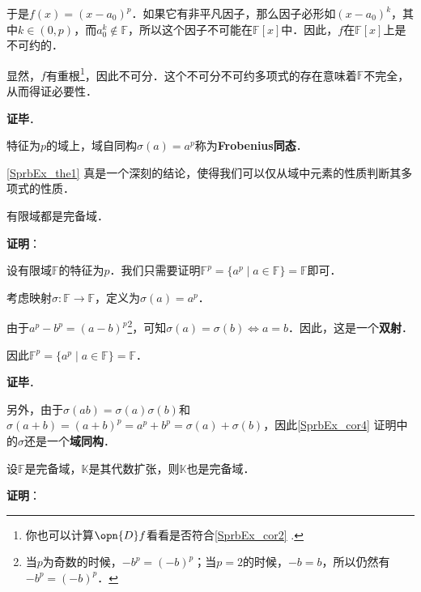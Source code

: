 于是$f(x)=(x-a_0)^p$．如果它有非平凡因子，那么因子必形如$(x-a_0)^k$，其中$k\in(0, p)$，而$a_0^k\not\in\mathbb{F}$，所以这个因子不可能在$\mathbb{F}[x]$中．因此，$f$在$\mathbb{F}[x]$上是不可约的．

显然，$f$有重根\footnote{你也可以计算$\opn{D}f$看看是否符合\autoref{SprbEx_cor2} .}，因此不可分．这个不可分不可约多项式的存在意味着$\mathbb{F}$不完全，从而得证必要性．

\textbf{证毕}．




特征为$p$的域上，域自同构$\sigma(a)=a^p$称为\textbf{Frobenius同态}．


\autoref{SprbEx_the1} 真是一个深刻的结论，使得我们可以仅从域中元素的性质判断其多项式的性质．









\begin{corollary}{}\label{SprbEx_cor4}
有限域都是完备域．
\end{corollary}

\textbf{证明}：

设有限域$\mathbb{F}$的特征为$p$．我们只需要证明$\mathbb{F}^p=\{a^p\mid a\in\mathbb{F}\}=\mathbb{F}$即可．

考虑映射$\sigma:\mathbb{F}\to\mathbb{F}$，定义为$\sigma(a)=a^p$．

由于$a^p-b^p=(a-b)^p$\footnote{当$p$为奇数的时候，$-b^p=(-b)^p$；当$p=2$的时候，$-b=b$，所以仍然有$-b^p=(-b)^p$．}，可知$\sigma(a)=\sigma(b)\iff a=b$．因此，这是一个\textbf{双射}．

因此$\mathbb{F}^p=\{a^p\mid a\in\mathbb{F}\}=\mathbb{F}$．

\textbf{证毕}．

另外，由于$\sigma(ab)=\sigma(a)\sigma(b)$和$\sigma(a+b)=(a+b)^p=a^p+b^p=\sigma(a)+\sigma(b)$，因此\autoref{SprbEx_cor4} 证明中的$\sigma$还是一个\textbf{域同构}．


\begin{corollary}{}\label{SprbEx_cor5}
设$\mathbb{F}$是完备域，$\mathbb{K}$是其代数扩张，则$\mathbb{K}$也是完备域．
\end{corollary}


\textbf{证明}：


